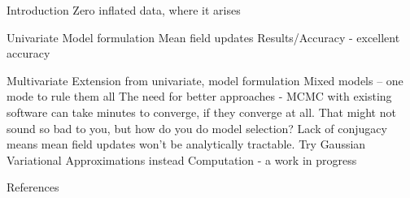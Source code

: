 \documentclass{beamer}
\begin{document}
\begin{frame}
Introduction
Zero inflated data, where it arises
\end{frame}

\begin{frame}
Univariate
Model formulation
Mean field updates
Results/Accuracy - excellent accuracy
\end{frame}

\begin{frame}
Multivariate
Extension from univariate, model formulation
Mixed models -- one mode to rule them all
The need for better approaches - MCMC with existing software can take minutes to
converge, if they converge at all. That might not sound so bad to you, but how do you
do model selection?
Lack of conjugacy means mean field updates won't be analytically tractable. Try
Gaussian Variational Approximations instead
Computation - a work in progress
\end{frame}

\begin{frame}
References
\end{frame}
\end{document}
